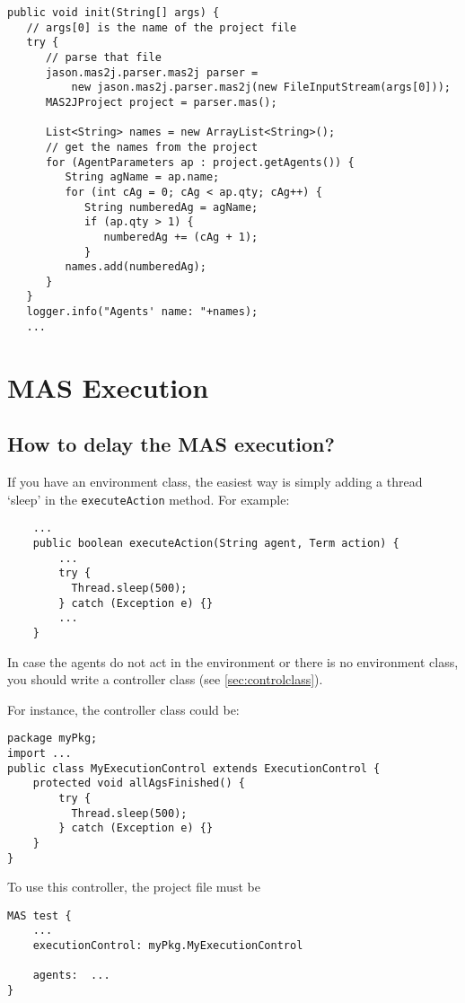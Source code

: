 \documentclass{article}
\newcommand{\code}[1]{\texttt{#1}}
\begin{document}
\begin{verbatim}
public void init(String[] args) {
   // args[0] is the name of the project file
   try {
      // parse that file
      jason.mas2j.parser.mas2j parser =
          new jason.mas2j.parser.mas2j(new FileInputStream(args[0]));
      MAS2JProject project = parser.mas();
			
      List<String> names = new ArrayList<String>();
      // get the names from the project
      for (AgentParameters ap : project.getAgents()) {
         String agName = ap.name;
         for (int cAg = 0; cAg < ap.qty; cAg++) {
            String numberedAg = agName;
            if (ap.qty > 1) {
               numberedAg += (cAg + 1);
            }
         names.add(numberedAg);
      }
   }
   logger.info("Agents' name: "+names);
   ...
\end{verbatim}



\section{MAS Execution}

\subsection{How to delay the MAS execution?}

If you have an environment class, the easiest way is simply adding a
thread `sleep' in the \code{executeAction} method. For example:
\begin{verbatim}
    ...
    public boolean executeAction(String agent, Term action) {
        ...
        try { 
          Thread.sleep(500); 
        } catch (Exception e) {}
        ...
    }
\end{verbatim}

In case the agents do not act in the environment or there is no
environment class, you should write a controller class (see
\ref{sec:controlclass}).

For instance, the controller class could be:
\begin{verbatim}
package myPkg;
import ...
public class MyExecutionControl extends ExecutionControl {
    protected void allAgsFinished() {
        try { 
          Thread.sleep(500); 
        } catch (Exception e) {}
    }
}
\end{verbatim}

To use this controller, the project file must be
\begin{verbatim}
MAS test {
    ...
    executionControl: myPkg.MyExecutionControl

    agents:  ...
}
\end{verbatim}
\end{document}
